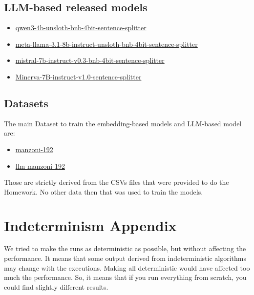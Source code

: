 \documentclass[11pt]{article}
\begin{document}
\subsection{LLM-based released models}

\begin{itemize}
	\item 
	\href{https://huggingface.co/fax4ever/qwen3-4b-unsloth-bnb-4bit-sentence-splitter}{qwen3-4b-unsloth-bnb-4bit-sentence-splitter}
	\item 
	\href{https://huggingface.co/fax4ever/meta-llama-3.1-8b-instruct-unsloth-bnb-4bit-sentence-splitter}{meta-llama-3.1-8b-instruct-unsloth-bnb-4bit-sentence-splitter}
	\item \href{https://huggingface.co/fax4ever/mistral-7b-instruct-v0.3-bnb-4bit-sentence-splitter}{mistral-7b-instruct-v0.3-bnb-4bit-sentence-splitter}
	\item \href{https://huggingface.co/fax4ever/Minerva-7B-instruct-v1.0-sentence-splitter}{Minerva-7B-instruct-v1.0-sentence-splitter}
\end{itemize}

\subsection{Datasets}

The main Dataset to train the embedding-based models and LLM-based model are:

\begin{itemize}
	\item \href{https://huggingface.co/datasets/fax4ever/manzoni-192}{manzoni-192}
	\item \href{https://huggingface.co/datasets/fax4ever/llm-manzoni-192}{llm-manzoni-192}
\end{itemize}

Those are strictly derived from the CSVs files that were provided to do the Homework.
No other data then that was used to train the models.

\section{Indeterminism Appendix}
\label{sec:appendix3}

We tried to make the runs as deterministic as possible, but without affecting the
performance.
It means that some output derived from indeterministic algorithms may change with the executions.
Making all deterministic would have affected too much the performance.
So, it means that if you run everything from scratch, you could find slightly different results.
\end{document}
